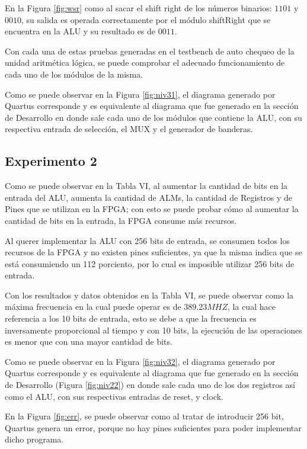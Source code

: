 \documentclass[journal]{IEEEtran}
\begin{document}
	En la Figura \ref{fig:wsr} como al sacar el shift right de los números binarios: $1101$ y $0010$, su salida es operada correctamente por el módulo shiftRight que se encuentra en la ALU y su resultado es de $0011$.
	
	Con cada una de estas pruebas generadas en el testbench de auto chequeo de la unidad aritmética lógica, se puede comprobar el adecuado funcionamiento de cada uno de los módulos de la misma.
	
	Como se puede observar en la Figura \ref{fig:niv31}, el diagrama generado por Quartus corresponde y es equivalente al diagrama que fue generado en la sección de Desarrollo en donde sale cada uno de los módulos que contiene la ALU, con su respectiva entrada de selección, el MUX y el generador de banderas.
	
	\subsection{Experimento 2}
	
	Como se puede observar en la Tabla VI, al aumentar la cantidad de bits en la entrada del ALU, aumenta la cantidad de ALMs, la cantidad de Registros y de Pines que se utilizan en la FPGA; con esto se puede probar cómo al aumentar la cantidad de bits en la entrada, la FPGA consume más recursos. 
	
	Al querer implementar la ALU con 256 bits de entrada, se consumen todos los recursos de la FPGA y no existen pines suficientes, ya que la misma indica que se está consumiendo un 112 porciento, por lo cual es imposible utilizar 256 bits de entrada.
	
	Con los resultados y datos obtenidos en la Tabla VI, se puede observar como la máxima frecuencia en la cual puede operar es de $389.23 MHZ$, la cual hace referencia a los 10 bits de entrada, esto se debe a que la frecuencia es inversamente proporcional al tiempo y con 10 bits, la ejecución de las operaciones es menor que con una mayor cantidad de bits.
	
	Como se puede observar en la Figura \ref{fig:niv32}, el diagrama generado por Quartus corresponde y es equivalente al diagrama que fue generado en la sección de Desarrollo (Figura \ref{fig:niv22}) en donde sale cada uno de los dos registros así como el ALU, con sus respectivas entradas de reset, y clock.
	
	En la Figura \ref{fig:err}, se puede observar como al tratar de introducir 256 bit, Quartus genera un error, porque no hay pines suficientes para poder implementar dicho programa.
	
\end{document}

